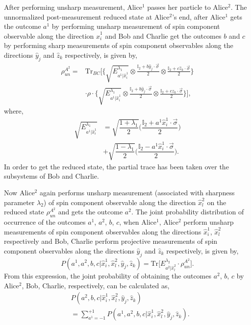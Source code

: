 \documentclass[pra,a4paper,aps,twocolumn,showpacs,superscriptaddress,groupedaddress]{revtex4}
\begin{document}
After performing unsharp measurement, Alice$^1$ passes her particle to Alice$^2$. The unnormalized post-measurement reduced state at Alice$^2$'s end, after Alice$^1$ gets the outcome $a^1$ by performing unsharp measurement of spin component observable along the direction $\hat{x}^1_i$ and Bob  and Charlie get the outcomes $b$ and $c$ by performing sharp measurements of spin component observables along the directions $\hat{y}_j$ and $\hat{z}_k$ respectively, is given by,
\begin{align}
\rho_{un}^{A^2} =& \text{Tr}_{B C} \Bigg[ \Bigg\{ \sqrt{E^{\lambda_1}_{a^1|\hat{x}^1_i}}  \otimes \frac{\mathbb{I}_2 + b \hat{y}_j \cdot \vec{\sigma}}{2} \otimes \frac{\mathbb{I}_2+ c \hat{z}_k \cdot \vec{\sigma}}{2} \Big\}  \nonumber \\ 
& \cdot \rho \cdot \Bigg\{ \sqrt{E^{\lambda_1}_{a^1|\hat{x}^1_i}}  \otimes \frac{\mathbb{I}_2 + b \hat{y}_j \cdot \vec{\sigma}}{2} \otimes \frac{\mathbb{I}_2+ c \hat{z}_k \cdot \vec{\sigma}}{2} \Big\} \Bigg],
\end{align}
where,
\begin{align}
\sqrt{E^{\lambda_1}_{a^1|\hat{x}^1_i}} &= \sqrt{\dfrac{1+\lambda_1}{2}} \Bigg( \dfrac{\mathbb{I}_2 + a^1 \hat{x}^1_i \cdot \vec{\sigma}}{2} \Bigg) \nonumber \\
& +\sqrt{\dfrac{1- \lambda_1}{2}} \Bigg( \dfrac{\mathbb{I}_2 - a^1 \hat{x}^1_i \cdot \vec{\sigma}}{2} \Bigg).
\end{align}
In order to get the reduced state, the partial trace has been taken over the subsystems of Bob and Charlie. 



Now Alice$^2$ again performs unsharp measurement (associated with sharpness parameter $\lambda_{2}$) of spin component observable along the direction $\hat{x}^2_l$ on the reduced state $\rho_{un}^{A^2}$ and gets the outcome $a^2$. The joint probability distribution of occurrence of the outcomes $a^1$, $a^2$, $b$, $c$, when Alice$^1$, Alice$^2$ perform unsharp measurements of spin component observables along the directions $\hat{x}^1_i$, $\hat{x}^2_l$ respectively and Bob, Charlie perform projective measurements of spin component observables along the directions $\hat{y}_j$ and $\hat{z}_k$ respectively, is given by,
\begin{equation}
P(a^1, a^2, b, c|\hat{x}^1_i, \hat{x}^2_l, \hat{y}_j, \hat{z}_k) = \text{Tr} \Big[ E^{\lambda_2}_{a^2|\hat{x}^2_l} \cdot \rho^{A^2}_{un} \Big].
\end{equation}
 From this expression, the joint probability of obtaining the outcomes $a^2$, $b$, $c$ by Alice$^2$, Bob, Charlie, respectively, can be calculated as,
\begin{align}
& P(a^2, b, c|\hat{x}^1_i, \hat{x}^2_l, \hat{y}_j, \hat{z}_k) \nonumber \\
&= \sum_{a^1 = -1}^{ +1} P(a^1, a^2, b, c|\hat{x}^1_i, \hat{x}^2_l, \hat{y}_j, \hat{z}_k).
\end{align}
\end{document}
